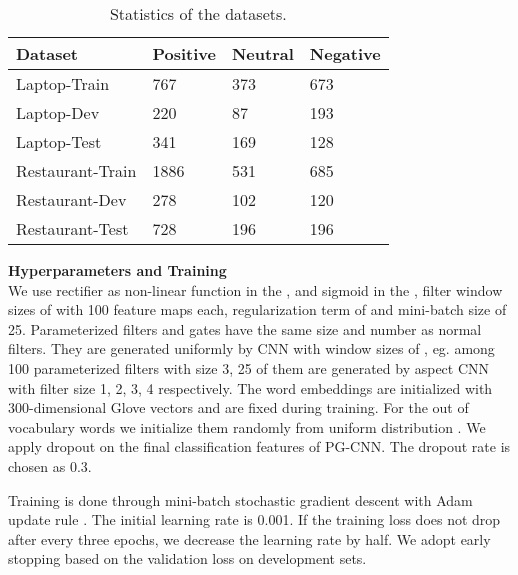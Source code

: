 \documentclass[11pt,a4paper]{article}
\begin{document}
\begin{table}[]
\centering
\label{data}
\begin{tabular}{|l|l|l|l|}
\hline
Dataset          & Positive & Neutral & Negative \\ \hline
Laptop-Train     & 767      &   373   & 673      \\ \hline
Laptop-Dev     & 220      & 87     & 193      \\ \hline
Laptop-Test      & 341      & 169     & 128      \\ \hline
Restaurant-Train & 1886     & 531     & 685      \\ \hline
Restaurant-Dev & 278     & 102     & 120      \\ \hline
Restaurant-Test  & 728      & 196     & 196      \\ \hline
\end{tabular}
\caption{Statistics of the datasets. }
\end{table}

\iffalse
\noindent \textbf{Evaluation Metric}\\
We use accuracy metric to measure the performance of the aspect-level sentiment classiﬁcation. It is defined as

where  is the number of correctly predicted instances and  is the total number of samples. 
\fi

\noindent \textbf{Hyperparameters and Training}\\
We use rectifier as non-linear function  in the ,  and sigmoid in the , filter window sizes of  with 100 feature maps each,  regularization term of  and mini-batch size of 25. Parameterized filters and  gates have the same size and number as normal filters. They are generated uniformly by CNN with window sizes of , eg. among 100 parameterized filters with size 3, 25 of them are generated by aspect CNN with filter size 1, 2, 3, 4 respectively. The word embeddings are initialized with 300-dimensional Glove vectors \cite{pennington2014glove} and are fixed during training. For the out of vocabulary words we initialize them randomly from uniform distribution . We apply dropout on the final classification features of PG-CNN. The dropout rate is chosen as 0.3.

Training is done through mini-batch stochastic gradient descent with Adam update rule \cite{kingma2014adam}. The initial learning rate is 0.001. If the training loss does not drop after every three epochs, we decrease the learning rate by half. We adopt early stopping based on the validation loss on development sets. 
\end{document}

